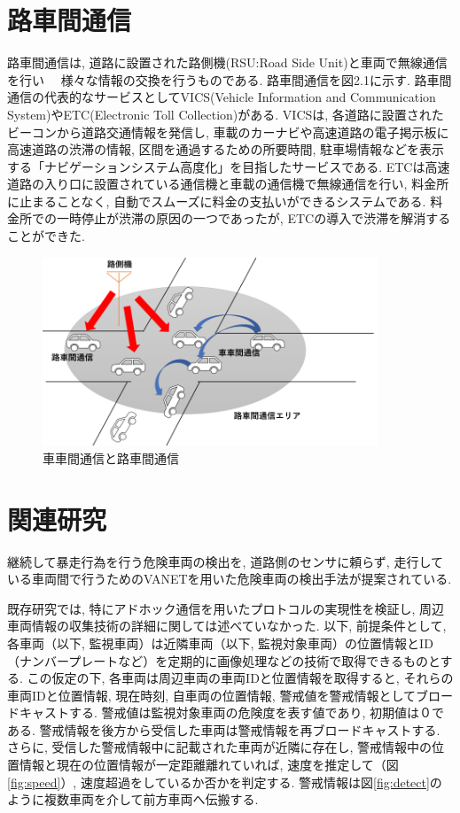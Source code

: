 \documentclass[10pt]{jreport}
\begin{document}
\section{路車間通信}
路車間通信は, 道路に設置された路側機(RSU:Road Side Unit)と車両で無線通信を行い　
様々な情報の交換を行うものである. 路車間通信を図2.1に示す.  路車間通信の代表的なサービスとしてVICS(Vehicle Information and Communication System)やETC(Electronic Toll Collection)がある. VICSは, 各道路に設置されたビーコンから道路交通情報を発信し, 車載のカーナビや高速道路の電子掲示板に高速道路の渋滞の情報, 区間を通過するための所要時間, 駐車場情報などを表示する「ナビゲーションシステム高度化」を目指したサービスである. ETCは高速道路の入り口に設置されている通信機と車載の通信機で無線通信を行い, 料金所に止まることなく, 自動でスムーズに料金の支払いができるシステムである. 料金所での一時停止が渋滞の原因の一つであったが, ETCの導入で渋滞を解消することができた. 

\begin{figure}[H]
\centering
\includegraphics[width=10cm]{figures/2_2.png}
\caption{車車間通信と路車間通信}
\end{figure}

\section{関連研究}
継続して暴走行為を行う危険車両の検出を, 道路側のセンサに頼らず, 走行している車両間で行うためのVANETを用いた危険車両の検出手法が提案されている\cite{sample10}. 
 
既存研究では, 特にアドホック通信を用いたプロトコルの実現性を検証し, 周辺車両情報の収集技術の詳細に関しては述べていなかった. 以下, 前提条件として, 各車両（以下, 監視車両）は近隣車両（以下, 監視対象車両）の位置情報とID（ナンバープレートなど）を定期的に画像処理などの技術で取得できるものとする. この仮定の下, 各車両は周辺車両の車両IDと位置情報を取得すると, それらの車両IDと位置情報, 現在時刻, 自車両の位置情報, 警戒値を警戒情報としてブロードキャストする. 警戒値は監視対象車両の危険度を表す値であり, 初期値は０である. 警戒情報を後方から受信した車両は警戒情報を再ブロードキャストする. さらに, 受信した警戒情報中に記載された車両が近隣に存在し, 警戒情報中の位置情報と現在の位置情報が一定距離離れていれば, 速度を推定して（図\ref{fig:speed}）, 速度超過をしているか否かを判定する. 警戒情報は図\ref{fig:detect}のように複数車両を介して前方車両へ伝搬する. 
\end{document}
